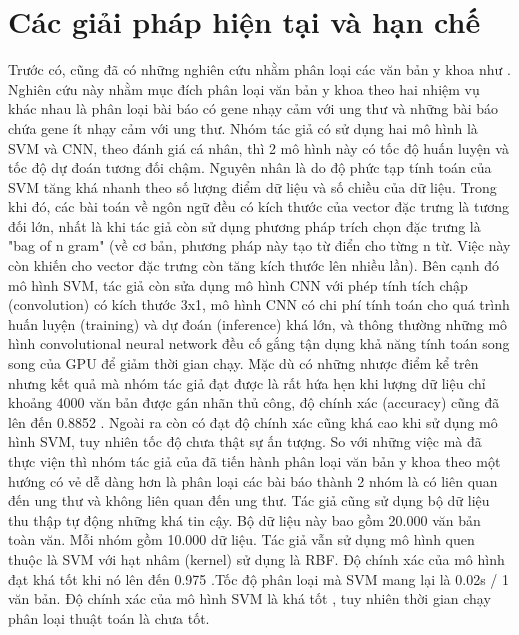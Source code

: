 \documentclass[../DoAn.tex]{subfiles}
\begin{document}
\section{Các giải pháp hiện tại và hạn chế}
\label{sec:giaiphap}
Trước có, cũng đã có những nghiên cứu nhằm phân loại các văn bản y khoa như \cite{useML}. Nghiên cứu này nhằm mục đích phân loại văn bản y khoa theo hai nhiệm vụ khác nhau là phân loại bài báo có gene nhạy cảm với ung thư và những bài báo chứa gene ít nhạy cảm với ung thư. Nhóm tác giả có sử dụng hai mô hình là SVM và CNN, theo đánh giá cá nhân, thì 2 mô hình này có tốc độ huấn luyện và tốc độ dự đoán tương đối chậm. Nguyên nhân là do độ phức tạp tính toán của SVM tăng khá nhanh theo số lượng điểm dữ liệu và số chiều của dữ liệu. Trong khi đó, các bài toán về ngôn ngữ đều có kích thước của vector đặc trưng là tương đối lớn, nhất là khi tác giả còn sử dụng phương pháp trích chọn đặc trưng là "bag of n gram" (về cơ bản, phương pháp này tạo từ điển cho từng n từ. Việc này còn khiến cho vector đặc trưng còn tăng kích thước lên nhiều lần). Bên cạnh đó mô hình SVM, tác giả còn sửa dụng mô hình CNN với phép tính tích chập (convolution) có kích thước 3x1, mô hình CNN có chi phí tính toán cho quá trình huấn luyện (training) và dự đoán (inference) khá lớn, và thông thường những mô hình convolutional neural network đều cố gắng tận dụng khả năng tính toán song song của GPU để giảm thời gian chạy.  Mặc dù có những nhược điểm kể trên nhưng kết quả mà nhóm tác giả đạt được là rất hứa hẹn khi lượng dữ liệu chỉ khoảng 4000 văn bản được gán nhãn thủ công, độ chính xác (accuracy) cũng đã lên đến 0.8852 . Ngoài ra còn có \cite{GAPscreener} đạt độ chính xác cũng khá cao khi sử dụng mô hình SVM, tuy nhiên tốc độ chưa thật sự ấn tượng. So với những việc mà \cite{useML} đã thực viện thì nhóm tác giả của \cite{GAPscreener} đã tiến hành phân loại văn bản y khoa theo một hướng có vẻ dễ dàng hơn là phân loại các bài báo thành 2 nhóm là có liên quan đến ung thư và không liên quan đến ung thư. Tác giả cũng sử dụng bộ dữ liệu thu thập tự động những khá tin cậy. Bộ dữ liệu này bao gồm 20.000 văn bản toàn văn. Mỗi nhóm gồm 10.000 dữ liệu. Tác giả vẫn sử dụng mô hình quen thuộc là SVM với hạt nhâm (kernel) sử dụng là RBF. Độ chính xác của mô hình đạt khá tốt khi nó lên đến 0.975 .Tốc độ phân loại mà SVM mang lại là 0.02s / 1 văn bản. Độ chính xác của mô hình SVM là khá tốt , tuy nhiên thời gian chạy phân loại thuật toán là chưa tốt. 
\end{document}
